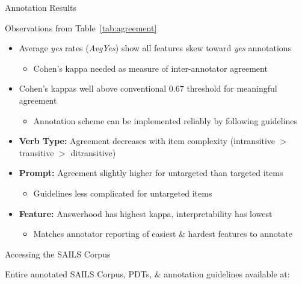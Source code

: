 \documentclass[final,t]{beamer}
\begin{document}
\begin{frame}{}
\begin{columns}[t]
\begin{column}{.33\linewidth}
\begin{block}{Annotation Results}
\begin{center}
\begin{minipage}{.85\textwidth}
\begin{center}
  Observations from Table~\ref{tab:agreement}
\end{center}
\begin{itemize}
	\vspace{.5em}
	\item Average \textit{yes} rates (\textit{AvgYes}) show all features skew toward \textit{yes} annotations
          \begin{itemize}
          \item Cohen's kappa needed as measure of inter-annotator agreement
          \end{itemize}
	\vspace{.5em}
	\item Cohen's kappas well above conventional 0.67 threshold for meaningful agreement
          \begin{itemize}
          \item Annotation scheme can be implemented reliably by following guidelines
          \end{itemize}
	\vspace{.5em}
	\item \textbf{Verb Type:} Agreement decreases with item complexity (intransitive $>$ transitive $>$ ditransitive)
	\vspace{.5em}
	\item \textbf{Prompt:} Agreement slightly higher for untargeted than targeted items
          \begin{itemize}
          \item Guidelines less complicated for untargeted items
          \end{itemize}
	\vspace{.5em}
	\item \textbf{Feature:} Answerhood has highest kappa, interpretability has lowest
          \begin{itemize}
          \item Matches annotator reporting of easiest \& hardest features to annotate
          \end{itemize}
\end{itemize}

\end{minipage}
\end{center}
\end{block}

\begin{block}{Accessing the SAILS Corpus}
\begin{center}
\begin{minipage}{.85\textwidth}
Entire annotated SAILS Corpus, PDTs, \& annotation guidelines available at:


\end{minipage}
\end{center}
\end{block}
\end{column}
\end{columns}
\end{frame}
\end{document}
